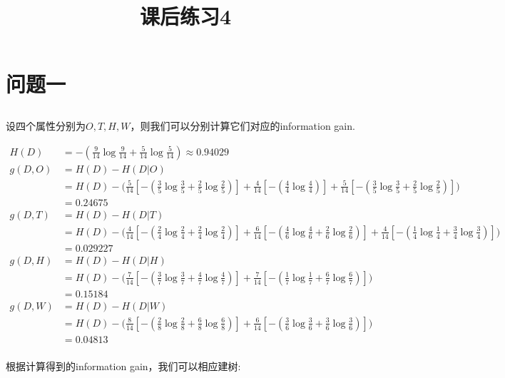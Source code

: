 \documentclass[12pt, a4paper]{article}
\title{课后练习4}
\author{}
\date{}
\begin{document}
\maketitle %

\section{问题一}

\subsection{}

设四个属性分别为$O,T,H,W$，则我们可以分别计算它们对应的information gain.

\begin{align*}
    H(D)&=-(\frac{9}{14}\log\frac{9}{14}+\frac{5}{14}\log\frac{5}{14})\approx0.94029\\
    g(D,O)&=H(D)-H(D\vert O)\\
    &=H(D)-\bigl(\frac{5}{14}[-(\frac{3}{5}\log\frac{3}{5}+\frac{2}{5}\log\frac{2}{5})]
    +\frac{4}{14}[-(\frac{4}{4}\log\frac{4}{4})]
    +\frac{5}{14}[-(\frac{3}{5}\log\frac{3}{5}+\frac{2}{5}\log\frac{2}{5})]\bigr)\\
    &=0.24675\\
    g(D,T)&=H(D)-H(D\vert T)\\
    &=H(D)-\bigl(\frac{4}{14}[-(\frac{2}{4}\log\frac{2}{4}+\frac{2}{4}\log\frac{2}{4})]
    +\frac{6}{14}[-(\frac{4}{6}\log\frac{4}{6}+\frac{2}{6}\log\frac{2}{6})]
    +\frac{4}{14}[-(\frac{1}{4}\log\frac{1}{4}+\frac{3}{4}\log\frac{3}{4})]\bigr)\\
    &=0.029227\\
    g(D,H)&=H(D)-H(D\vert H)\\
    &=H(D)-\bigl(\frac{7}{14}[-(\frac{3}{7}\log\frac{3}{7}+\frac{4}{7}\log\frac{4}{7})]
    +\frac{7}{14}[-(\frac{1}{7}\log\frac{1}{7}+\frac{6}{7}\log\frac{6}{7})]\bigr)\\
    &=0.15184\\
    g(D,W)&=H(D)-H(D\vert W)\\
    &=H(D)-\bigl(\frac{8}{14}[-(\frac{2}{8}\log\frac{2}{8}+\frac{6}{8}\log\frac{6}{8})]
    +\frac{6}{14}[-(\frac{3}{6}\log\frac{3}{6}+\frac{3}{6}\log\frac{3}{6})]\bigr)\\
    &=0.04813\\
\end{align*}

根据计算得到的information gain，我们可以相应建树:
\end{document}
